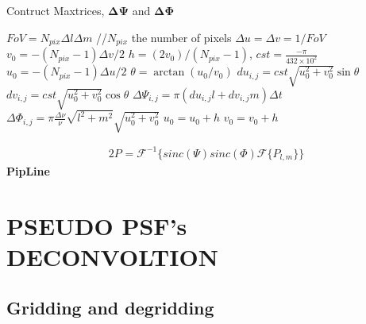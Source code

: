 \begin{algorithm}
\caption{Contruct Maxtrices, $\mathbf{\Delta \Psi}$ and $\mathbf{\Delta \Phi}$}
\label{CHalgorithm}
\begin{algorithmic}[1]
\State $FoV = N_{pix}\Delta l \Delta m$ //$N_{pix}$ the number of pixels
\State $\Delta u=\Delta v=1/FoV$
\State $v_0=-(N_{pix}-1)\Delta v /2$ 
\State $h=(2v_0)/(N_{pix}-1)$, $cst = \frac{-\pi}{432\times 10^2}$
\State $u_0=-(N_{pix}-1) \Delta u /2$
\State $\theta = \arctan(u_0/v_0)$
\State $du_{i,j} = cst\sqrt{u_0^2+v_0^2}\sin \theta$
\State $dv_{i,j} = cst\sqrt{u_0^2+v_0^2}\cos \theta$
\State $\Delta \Psi_{i,j}= \pi(du_{i,j}l+dv_{i,j}m)\Delta t$
\State $\Delta \Phi_{i,j}= \pi  \frac{\Delta \nu}{\nu}\sqrt{l^2+m^2}\sqrt{u_0^2+v_0^2}$
\State $u_{0}=u_{0}+h$
\EndFor
\State $v_{0}=v_{0}+h$
\EndFor
\EndProcedure
\end{algorithmic}
\end{algorithm}
\begin{alignat}{2}
P_{}= \mathcal{F}^{-1}\Big\{sinc(\Psi) sinc(\Phi) \mathcal{F}\{P_{l,m}\}\Big\}
\end{alignat}
{\bf PipLine}
\section{PSEUDO PSF's DECONVOLTION}
\subsection{Gridding and degridding}
